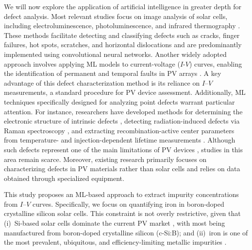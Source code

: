 \documentclass[a4paper,fleqn,draft]{cas-sc}
\begin{document}
We will now explore the application of artificial intelligence in greater depth for defect analysis.
Most relevant studies focus on image analysis of solar cells, including electroluminescence, photoluminescence,
and infrared thermography \cite{AlOtum2024, Pratt2021, Li2024a, Lin2021, Tang2020, Bu2022, Turek2023, Huang2022}.
These methods facilitate detecting and classifying defects such as cracks, finger failures, hot spots, scratches,
and horizontal dislocations and are predominantly implemented using convolutional neural networks.
Another widely adopted approach involves applying ML models to current-voltage ($I$-$V$) curves,
enabling the identification of permanent and temporal faults in PV arrays \cite{Liu2021, Chen2019, Hopwood2020, Mellit2021}.
A key advantage of this defect characterization method is its reliance on $I$–$V$ measurements,
a standard procedure for PV device assessment.
Additionally, ML techniques specifically designed for analyzing point defects warrant particular attention.
For instance, researchers have developed methods for determining
the electronic structure of intrinsic defects \cite{Ma2025, Choudhary2023},
detecting radiation-induced defects via Raman spectroscopy \cite{Chia2024, Park2022},
and extracting recombination-active center parameters from temperature- and injection-dependent
lifetime measurements \cite{Wang2024a, Buratti2022, Buratti2020a}.
Although such defects represent one of the main limitations of PV devices \cite{Le2024, Yamaguchi2018}, studies in this area remain scarce.
Moreover, existing research primarily focuses on characterizing defects in PV materials rather than solar cells and relies on data obtained through specialized equipment.

This study proposes an ML-based approach to extract impurity concentrations from $I$–$V$ curves.
Specifically, we focus on quantifying iron in boron-doped crystalline silicon solar cells.
This constraint is not overly restrictive, given that
(i)~Si-based solar cells dominate the current PV market \cite{Bosnjakovic2024, Zhang2021},
with most being manufactured from boron-doped crystalline silicon (c-Si:B);
and (ii)~iron is one of the most prevalent, ubiquitous, and efficiency-limiting metallic impurities \cite{Buonassisi2006, IronSC}.
\end{document}
